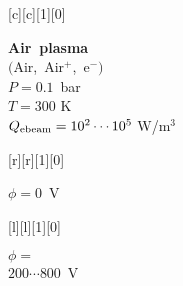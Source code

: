 [c][c][1][0]{
   \begin{minipage}{0.7\textwidth} 
      \centering
       {\bf\boldmath Air~plasma}\\[0.7em]
      $\big($Air,~Air$^+$,~e$^-$$\big)$\\[0.7em]
      $P=0.1$~bar\\[0.7em]
      $T=300$ K\\[0.7em]
      $Q_{\rm ebeam}=10^2 \cdots  10^{5}$ W/m$^{3}$
   \end{minipage}}
[r][r][1][0]{\begin{minipage}{0.15\textwidth}$\phi=0$~V\end{minipage}}
[l][l][1][0]{\begin{minipage}{0.2\textwidth}$\phi=$\\$200\cdots800$~V\end{minipage}}

